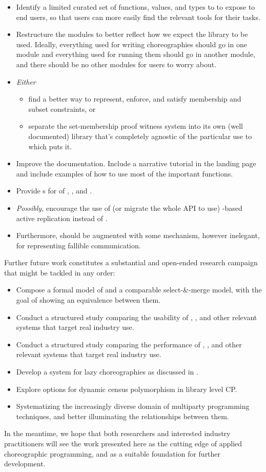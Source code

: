 \begin{itemize}
	\item Identify a limited curated set of functions, values, and types to to expose to end users,
		so that users can more easily find the relevant tools for their tasks.
	\item Restructure the modules to better reflect how we expect the library to be used.
		Ideally, everything used for writing choreographies should go in one module
		and everything used for running them should go in another module,
		and there should be no other modules for users to worry about.
	\item \emph{Either}
		\begin{itemize}
			\item find a better way to represent, enforce, and satisfy membership and subset constraints, or
			\item separate the set-membership proof witness system into its own (well documented) library
				that's completely agnostic of the particular use to which \MultiChor puts it.
		\end{itemize}
	\item Improve the documentation.
		Include a narrative tutorial in the landing page
		and include examples of how to use most of the important functions.
	\item Provide s for  of , , and .
	\item \emph{Possibly,} encourage the use of (or migrate the whole API to use)
		-based active replication instead of .
	\item Furthermore, \MultiChor should be augmented with some mechanism,
		however inelegant,
		for representing fallible communication.
\end{itemize}
Further future work constitutes a substantial and open-ended research campaign that might be tackled in any order:
\begin{itemize}
	\item Compose a formal model of \minichor and a comparable select-\&-merge model,
		with the goal of showing an equivalence between them.
	\item Conduct a structured study comparing the usability of \MultiChor, \minichor,
		and other relevant systems that target real industry use.
	\item Conduct a structured study comparing the performance of \MultiChor, \minichor,
		and other relevant systems that target real industry use.
	\item Develop a system for lazy choreographies as discussed in .
	\item Explore options for dynamic census polymorphism in library level CP.
	\item Systematizing the increasingly diverse domain of multiparty programming techniques,
		and better illuminating the relationships between them.
\end{itemize}

In the meantime, we hope that both researchers and interested industry practitioners
will see the work presented here as the cutting edge of applied choreographic programming,
and as a suitable foundation for further development.




